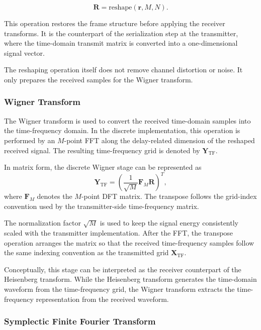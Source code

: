 \begin{equation}
    \mathbf{R} = \mathrm{reshape}(\mathbf{r}, M, N).
\end{equation}

This operation restores the frame structure before applying the receiver transforms. It is the counterpart of the serialization step at the transmitter, where the time-domain transmit matrix is converted into a one-dimensional signal vector.

The reshaping operation itself does not remove channel distortion or noise. It only prepares the received samples for the Wigner transform.

\subsubsection{Wigner Transform}

The Wigner transform is used to convert the received time-domain samples into the time-frequency domain. In the discrete implementation, this operation is performed by an \(M\)-point FFT along the delay-related dimension of the reshaped received signal. The resulting time-frequency grid is denoted by \(\mathbf{Y}_{\mathrm{TF}}\).

In matrix form, the discrete Wigner stage can be represented as
\begin{equation}
    \mathbf{Y}_{\mathrm{TF}}
    =
    \left(
    \frac{1}{\sqrt{M}}\mathbf{F}_{M}\mathbf{R}
    \right)^{T},
    \label{eq:receiver_wigner_matrix}
\end{equation}
where \(\mathbf{F}_{M}\) denotes the \(M\)-point DFT matrix. The transpose follows the grid-index convention used by the transmitter-side time-frequency matrix.

The normalization factor \(\sqrt{M}\) is used to keep the signal energy consistently scaled with the transmitter implementation. After the FFT, the transpose operation arranges the matrix so that the received time-frequency samples follow the same indexing convention as the transmitted grid \(\mathbf{X}_{\mathrm{TF}}\).

Conceptually, this stage can be interpreted as the receiver counterpart of the Heisenberg transform. While the Heisenberg transform generates the time-domain waveform from the time-frequency grid, the Wigner transform extracts the time-frequency representation from the received waveform.

\subsubsection{Symplectic Finite Fourier Transform}


